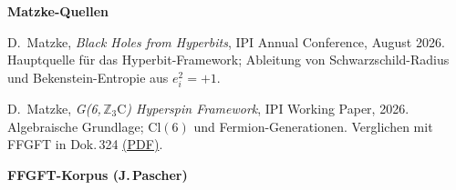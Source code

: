 
\noindent\textbf{Matzke-Quellen}

\begin{description}[leftmargin=3.5em,style=sameline,itemsep=0.4em]

\item[{[M1]}] D.~Matzke, \textit{Black Holes from Hyperbits},
  IPI Annual Conference, August 2026. \\
  Hauptquelle für das Hyperbit-Framework; Ableitung von Schwarzschild-Radius
  und Bekenstein-Entropie aus $e_i^2 = +1$.

\item[{[M2]}] D.~Matzke, \textit{G(6,\,$\mathbb{Z}_3\text{C}$) Hyperspin
  Framework}, IPI Working Paper, 2026. \\
  Algebraische Grundlage; $\mathrm{Cl}(6)$ und Fermion-Generationen.
  Verglichen mit FFGFT in Dok.\,324
  \href{https://github.com/jpascher/T0-Time-Mass-Duality/blob/main/2/pdf/324_G6_Z3C_FFGFT_Vergleich_De.pdf}{(PDF)}.

\end{description}

\bigskip
\noindent\textbf{FFGFT-Korpus (J.\,Pascher)}

